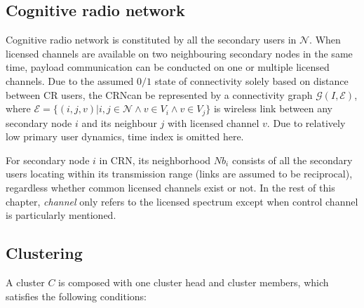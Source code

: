 \subsection*{Cognitive radio network}
Cognitive radio network is constituted by all the secondary users in $\mathcal{N}$.
When licensed channels are available on two neighbouring secondary nodes in the same time, payload communication can be conducted on one or multiple licensed channels.
Due to the assumed $0/1$ state of connectivity solely based on distance between CR users, the CRNcan be represented by a connectivity graph $\mathcal{G}(I,\mathcal{E})$, where $\mathcal{E}=\lbrace(i,j,v) \vert i, j \in \mathcal{N} \wedge v\in V_i \wedge v\in V_j \rbrace$ is wireless link between any secondary node $i$ and its neighbour $j$ with licensed channel $v$.
Due to relatively low primary user dynamics, time index is omitted here.


For secondary node $i$ in CRN, its neighborhood $Nb_i$ consists of all the secondary users locating within its transmission range (links are assumed to be reciprocal), regardless whether common licensed channels exist or not. 
In the rest of this chapter, \textit{channel} only refers to the licensed spectrum except when control channel is particularly mentioned.

\subsection*{Clustering}
A cluster $C$ is composed with one cluster head and cluster members, which satisfies the following conditions:

